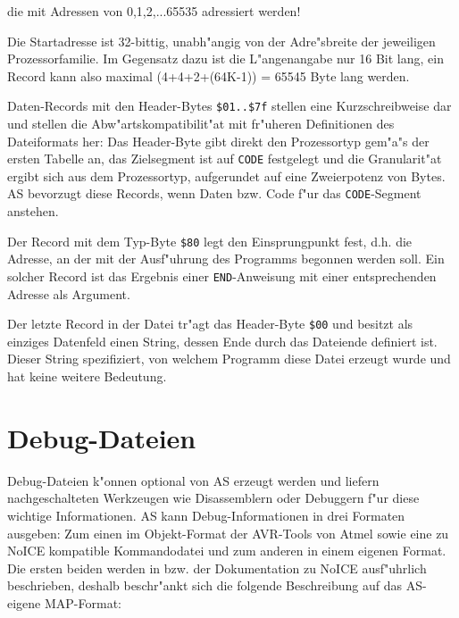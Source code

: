 \documentclass[12pt,a4paper,twoside]{report}
\newcommand{\tty}[1]{{\tt #1}}
\begin{document}
die mit Adressen von 0,1,2,...65535 adressiert werden!
\par
Die Startadresse ist 32-bittig, unabh"angig von der Adre"sbreite der
jeweiligen Prozessorfamilie.  Im Gegensatz dazu ist die L"angenangabe
nur 16 Bit lang, ein Record kann also maximal (4+4+2+(64K-1)) = 65545
Byte lang werden.
\par
Daten-Records mit den Header-Bytes \verb!$01..$7f! stellen eine
Kurzschreibweise dar und stellen die Abw"artskompatibilit"at mit fr"uheren
Definitionen des Dateiformats her: Das Header-Byte gibt direkt den
Prozessortyp gem"a"s der ersten Tabelle an, das Zielsegment ist auf \tty{CODE}
festgelegt und die Granularit"at ergibt sich aus dem Prozessortyp,
aufgerundet auf eine Zweierpotenz von Bytes.  AS bevorzugt diese Records,
wenn Daten bzw. Code f"ur das \tty{CODE}-Segment anstehen.
\par
Der Record mit dem Typ-Byte \verb!$80! legt den Einsprungpunkt fest, d.h.
die Adresse, an der mit der Ausf"uhrung des Programms begonnen werden
soll.  Ein solcher Record ist das Ergebnis einer \tty{END}-Anweisung mit
einer entsprechenden Adresse als Argument.
\par
Der letzte Record in der Datei tr"agt das Header-Byte \verb!$00! und besitzt
als einziges Datenfeld einen String, dessen Ende durch das Dateiende
definiert ist.  Dieser String spezifiziert, von welchem Programm diese
Datei erzeugt wurde und hat keine weitere Bedeutung.


\section{Debug-Dateien}\label{SectDebugFormat}

Debug-Dateien k"onnen optional von AS erzeugt werden und liefern
nachgeschalteten Werkzeugen wie Disassemblern oder Debuggern f"ur diese
wichtige Informationen.  AS kann Debug-Informationen in drei Formaten
ausgeben: Zum einen im Objekt-Format der AVR-Tools von Atmel sowie eine zu
NoICE kompatible Kommandodatei und zum anderen in einem eigenen Format.
Die ersten beiden werden in \cite{AVRObj} bzw. der Dokumentation zu
NoICE ausf"uhrlich beschrieben, deshalb beschr"ankt sich die folgende
Beschreibung auf das AS-eigene MAP-Format:
\end{document}
